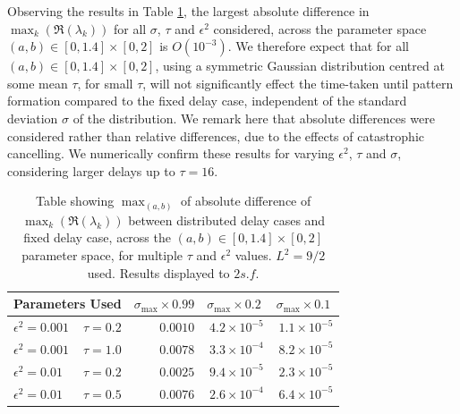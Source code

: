 Observing the results in Table \ref{tab:tab1}, the largest absolute difference in $\max_k(\Re(\lambda_k))$ for all $\sigma$, $\tau$ and $\epsilon^2$ considered, across the parameter space $(a,b)\in[0,1.4]\times[0,2]$ is $O(10^{-3})$. We therefore expect that for all $(a,b)\in[0,1.4]\times[0,2]$,
using a symmetric Gaussian distribution centred at some mean $\tau$, for small $\tau$, will not significantly effect the time-taken until pattern formation compared to the fixed delay case, independent of the standard deviation $\sigma$ of the distribution. We remark here that absolute differences were considered rather than relative differences, due to the effects of catastrophic cancelling. We numerically confirm these results for varying $\epsilon^2$, $\tau$ and $\sigma$, considering larger delays up to $\tau=16$.

\begin{table}[H]
\centering
\begin{tabular}{lrrrr}
\hline
\multicolumn{2}{c}{Parameters Used}    & $\sigma_{\max}\times0.99$ & $\sigma_{\max}\times0.2\ $ & $\sigma_{\max}\times0.1\ $ \\ \hline
$\epsilon^2=0.001$ & \textbf{$\tau=0.2$} & $0.0010$                           & $4.2\times10^{-5}$                & $1.1\times10^{-5}$                \\
$\epsilon^2=0.001$ & $\tau=1.0$          & $0.0078$                           & $3.3\times10^{-4}$                & $8.2\times10^{-5}$                \\
$\epsilon^2=0.01$  & \textbf{$\tau=0.2$} & $0.0025$                           & $9.4\times10^{-5}$                & $2.3\times10^{-5}$                \\
$\epsilon^2=0.01$  & \textbf{$\tau=0.5$} & \textbf{$0.0076$}                  & $2.6\times10^{-4}$                & $6.4\times10^{-5}$               \\ \hline
\end{tabular}
\caption{Table showing $\max_{(a,b)}$ of absolute difference of $\max_k(\Re(\lambda_k))$ between distributed delay cases and fixed delay case, across the $(a,b)\in[0,1.4]\times[0,2]$ parameter space, for multiple $\tau$ and $\epsilon^2$ values. $L^2=9/2$ used. Results displayed to $2 s.f.$}
\label{tab:tab1}
\end{table}

